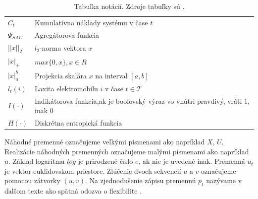 \begin{table}[H]
\begin{tabular}{ll}
    $C_{t}$ & Kumulatívna náklady systému v čase  $t$ \\
    $\Psi_{SAC}$ & Agregátorova funkcia   \\
    $||x||_{2}$ & $l_{2}$-norma vektora $x$ \\
    $|x|_{+}$ & $max\{0, x\}, x \in R$ \\
    $|x|_{a}^{b}$ & Projekcia skalára $x$  na interval $[a, b]$ \\
    $l_{t}(i)$ & Laxita elektromobilu $i$ v čase $t \in \mathcal{T}$ \\
    $I(\cdot)$ & Indikátorova funkcia,ak je boolovský výraz vo vnútri pravdivý, vráti 1, inak 0 \\
    $H(\cdot)$ & Diskrétna entropická funkcia
    \end{tabular}
    \caption[Tabuľka notácií.]{Tabuľka notácií. Zdroje tabuľky sú \cite{Li_information_aggregation, Li_2021,lee2021adaptivephd,chen2021smoothed, indicator-function}.}
    \label{notation-table}
\end{table}
Náhodné premenné označujeme veľkými písmenami ako napríklad $X$, $U$. Realizácie náhodných premenných označujeme malými písmenami ako napríklad $u$. Základ logaritmu $log$ je prirodzené číslo $e$, ak nie je uvedené inak. Premenná $u_{t}$ je vektor euklidovskom priestore. Zlúčenie dvoch sekvencií $u$ a $v$ označujeme pomocou zátvorky $(u, v)$. Na zjednodušenie zápisu premennú $p_{t}$ nazývame v ďalšom texte ako spätná odozva o flexibilite \cite{Li_information_aggregation}.
